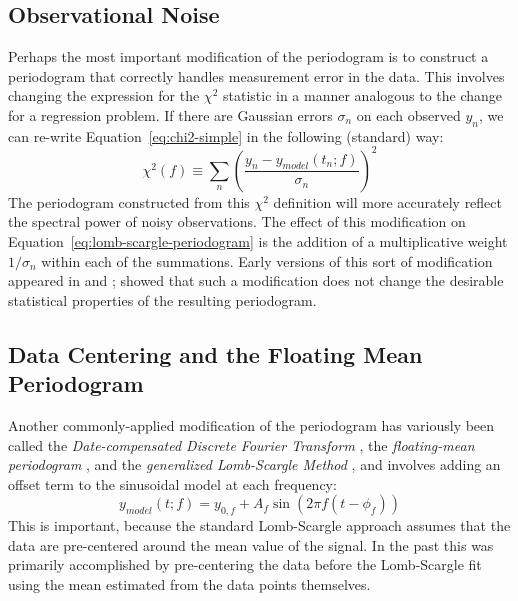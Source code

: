 \documentclass[preprint]{aastex}
\newcommand{\Eq}[1]{Equation~\ref{eq:#1}}
\newcommand{\eq}[1]{\Eq{#1}}
\newcommand{\eqlabel}[1]{\label{eq:#1}}
\newcommand{\sectlabel}[1]{\label{sect:#1}}
\begin{document}
\subsection{Observational Noise}
\label{extensions-observational-noise}
Perhaps the most important modification of the periodogram is to
construct a periodogram that correctly handles measurement error in the data.
This involves changing the expression for the $\chi^2$ statistic in a manner
analogous to the change for a regression problem.
If there are Gaussian errors $\sigma_n$ on each observed $y_n$, we can re-write \eq{chi2-simple} in the following (standard) way:
\begin{equation}
  \chi^2(f) \equiv \sum_n \left(\frac{y_n - y_{model}(t_n;f)}{\sigma_n}\right)^2
  \eqlabel{chi2-with-errors}
\end{equation}
The periodogram constructed from this $\chi^2$ definition will more accurately
reflect the spectral power of noisy observations.
The effect of this modification on \eq{lomb-scargle-periodogram} is the addition
of a multiplicative weight $1/\sigma_n$ within each of the summations.
Early versions of this sort of modification appeared in \citet{Gilliland87}
and \citet{Irwin89}; \citet{Zechmeister09} showed that such a modification
does not change the desirable statistical properties of the resulting
periodogram.


\subsection{Data Centering and the Floating Mean Periodogram}
\sectlabel{centering-data}

Another commonly-applied modification of the periodogram has variously been
called the {\it Date-compensated Discrete Fourier Transform} \citep{Ferraz-Mello81}, the {\it floating-mean periodogram} \citep{Cumming99}, and the {\it generalized Lomb-Scargle Method} \citep{Zechmeister09}, and involves adding an offset term to the sinusoidal model at each frequency:
\begin{equation}
  y_{model}(t;f) = y_{0, f} + A_f \sin(2 \pi f (t - \phi_f))
  \eqlabel{floating-mean-model}
\end{equation}
This is important, because the standard Lomb-Scargle approach assumes that the
data are pre-centered around the mean value of the signal.
In the past this was primarily accomplished by pre-centering the data before
the Lomb-Scargle fit using the mean estimated from the data points themselves.
\end{document}
